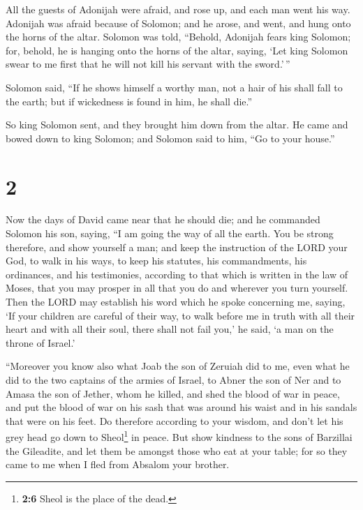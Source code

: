  All the guests of Adonijah were afraid, and rose up, and
each man went his way.  Adonijah was afraid because of
Solomon; and he arose, and went, and hung onto the horns of the altar.
 Solomon was told, ``Behold, Adonijah fears king Solomon;
for, behold, he is hanging onto the horns of the altar, saying, `Let
king Solomon swear to me first that he will not kill his servant with
the sword.'\,''

 Solomon said, ``If he shows himself a worthy man, not a
hair of his shall fall to the earth; but if wickedness is found in him,
he shall die.''

 So king Solomon sent, and they brought him down from the
altar. He came and bowed down to king Solomon; and Solomon said to him,
``Go to your house.''

\hypertarget{section-1}{%
\section{2}\label{section-1}}

 Now the days of David came near that he should die; and
he commanded Solomon his son, saying,  ``I am going the
way of all the earth. You be strong therefore, and show yourself a man;
 and keep the instruction of the LORD your God, to walk in
his ways, to keep his statutes, his commandments, his ordinances, and
his testimonies, according to that which is written in the law of Moses,
that you may prosper in all that you do and wherever you turn yourself.
 Then the LORD may establish his word which he spoke
concerning me, saying, `If your children are careful of their way, to
walk before me in truth with all their heart and with all their soul,
there shall not fail you,' he said, `a man on the throne of Israel.'

 ``Moreover you know also what Joab the son of Zeruiah did
to me, even what he did to the two captains of the armies of Israel, to
Abner the son of Ner and to Amasa the son of Jether, whom he killed, and
shed the blood of war in peace, and put the blood of war on his sash
that was around his waist and in his sandals that were on his feet.
 Do therefore according to your wisdom, and don't let his
grey head go down to Sheol\footnote{\textbf{2:6} Sheol is the place of
  the dead.} in peace.  But show kindness to the sons of
Barzillai the Gileadite, and let them be amongst those who eat at your
table; for so they came to me when I fled from Absalom your brother.

